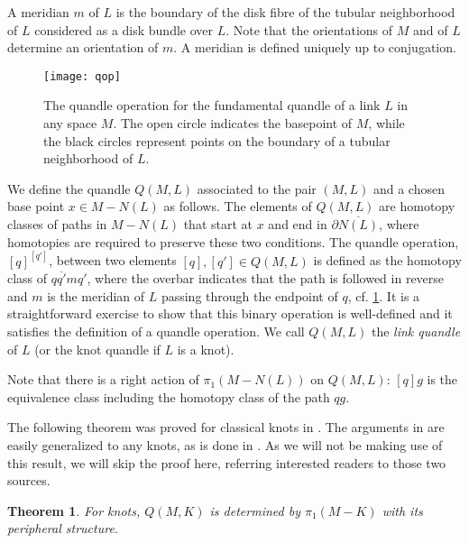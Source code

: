 \documentclass{amsart}
\newtheorem{theorem}{Theorem}
\begin{document}
A meridian $m$ of $L$ is the boundary of the disk fibre of the tubular neighborhood of $L$ considered as a disk bundle over $L$. Note that the orientations of $M$ and of $L$ determine an orientation of $m$. A meridian is defined uniquely up to conjugation.

\begin{figure}[htbp]
\begin{centering}
\texttt{[image: qop]}
\caption{The quandle operation for the fundamental quandle of a link $L$ in any space $M$. The
open circle indicates the basepoint of $M$, while the black circles represent points on the boundary of a tubular neighborhood of $L$.}
\label{qop}
\end{centering}
\end{figure}

We define the quandle $Q(M,L)$ associated to the pair $(M,L)$ and a chosen base point $x\in M-N(L)$ as follows. The elements of $Q(M,L)$ are homotopy classes of paths in $M-N(L)$ that start at $x$ and end in $\partial \overline{N(L)}$, where homotopies are required to preserve these two conditions. The quandle operation, $[q]^{[q']}$, between two elements $[q], [q']\in Q(M,L)$ is defined as the homotopy class of $q\overline{q'}mq'$, where the overbar indicates that the path is followed in reverse and $m$ is the meridian of $L$ passing through the endpoint of $q$, cf.  \ref{qop}. It is a straightforward exercise to show that this binary operation is well-defined and it satisfies the definition of a quandle operation. We call $Q(M,L)$ the \emph{link quandle} of $L$ (or the knot quandle if $L$ is a knot).

Note that there is a right action of $\pi_{1}(M-N(L))$ on $Q(M,L)$: $[q]g$ is the equivalence class including the homotopy class of the path $qg$.

The following theorem was proved for classical knots in \cite{DJ}. The arguments in \cite{DJ} are easily generalized to any knots, as is done in \cite{BKW}. As we will not be making use of this result, we will skip the proof here, referring interested readers to those two sources.

\begin{theorem}\label{main}
For knots, $Q(M,K)$ is determined by $\pi_{1}(M-K)$ with its peripheral structure.
\end{theorem}
\end{document}
